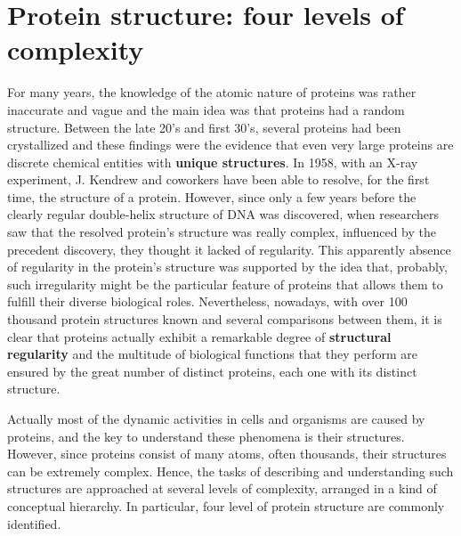 \section{Protein structure: four levels of complexity}\label{sec:prot-structure}
For many years, the knowledge of the atomic nature of proteins was rather inaccurate and vague and the main idea was that proteins had a random structure. Between the late 20's and first 30's, several proteins had been crystallized and these findings were the evidence that even very large proteins are discrete chemical entities with \textbf{unique structures}. 
In 1958, with an X-ray experiment, J. Kendrew and coworkers have been able to resolve, for the first time, the structure of a protein. However, since only a few years before the clearly regular double-helix structure of DNA was discovered, when researchers saw that the resolved protein's structure was really complex, influenced by the precedent discovery, they thought it lacked of regularity. This apparently absence of regularity in the protein's structure was supported by the idea that, probably, such irregularity might be the particular feature of proteins that allows them to fulfill their diverse biological roles. Nevertheless, nowadays, with over 100 thousand protein structures known and several comparisons between them, it is clear that proteins actually exhibit a remarkable degree of \textbf{structural regularity} and the multitude of biological functions that they perform are ensured by the great number of distinct proteins, each one with its distinct structure.

Actually most of the dynamic activities in cells and organisms are caused by proteins, and the key to understand these phenomena is their structures. However, since proteins consist of many atoms, often thousands, their structures can be extremely complex. Hence, the tasks of describing and understanding such structures are approached at several levels of complexity, arranged in a kind of conceptual hierarchy. In particular, four level of protein structure are commonly identified. 

